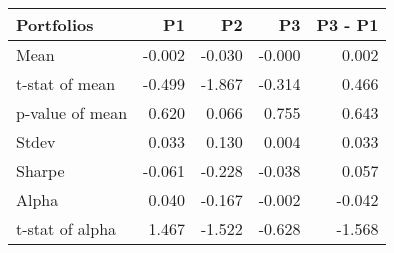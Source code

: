\begin{tabular}{lrrrr}
\toprule
Portfolios & P1 & P2 & P3 & P3 - P1 \\
\midrule
Mean & -0.002 & -0.030 & -0.000 & 0.002 \\
t-stat of mean & -0.499 & -1.867 & -0.314 & 0.466 \\
p-value of mean & 0.620 & 0.066 & 0.755 & 0.643 \\
Stdev & 0.033 & 0.130 & 0.004 & 0.033 \\
Sharpe & -0.061 & -0.228 & -0.038 & 0.057 \\
Alpha & 0.040 & -0.167 & -0.002 & -0.042 \\
t-stat of alpha & 1.467 & -1.522 & -0.628 & -1.568 \\
\bottomrule
\end{tabular}
